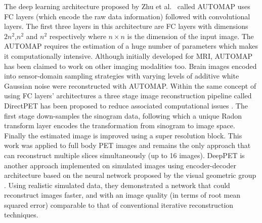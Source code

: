 The deep learning architecture proposed by Zhu et al.~\cite{zhu2018image} called AUTOMAP uses \ac{FC} layers (which encode the raw data information) followed with convolutional layers.
The first three layers in this architecture are \ac{FC} layers with dimensions $2n^2$,$n^2$ and $n^2$ respectively where $n\times{}n$ is the dimension of the input image. The AUTOMAP requires the estimation of a huge number of parameters which makes it computationally intensive. Although initially developed for \ac{MRI}, AUTOMAP has been claimed to work on other imaging modalities too. Brain images encoded into sensor-domain sampling strategies with varying levels of additive white Gaussian noise were reconstructed with AUTOMAP.  Within the same concept of using \ac{FC} layers' architectures a three stage image reconstruction pipeline called DirectPET has been proposed to reduce associated computational issues  \cite{whiteley2019direct}. The first stage down-samples the sinogram data, following which a unique Radon transform layer encodes the transformation from sinogram to image space. Finally the estimated image is improved using a super resolution block. This work was applied to full body \ac{PET} images and remains the only approach that can reconstruct multiple slices simultaneously (up to 16 images). DeepPET is another approach implemented on simulated images using encoder-decoder architecture based on the neural network proposed by the visual geometric group \cite{haeggstroem2018deeprec}. Using realistic simulated data, they demonstrated a network that could reconstruct images faster, and with an image quality (in terms of root mean squared error) comparable to that of conventional iterative reconstruction techniques.  


